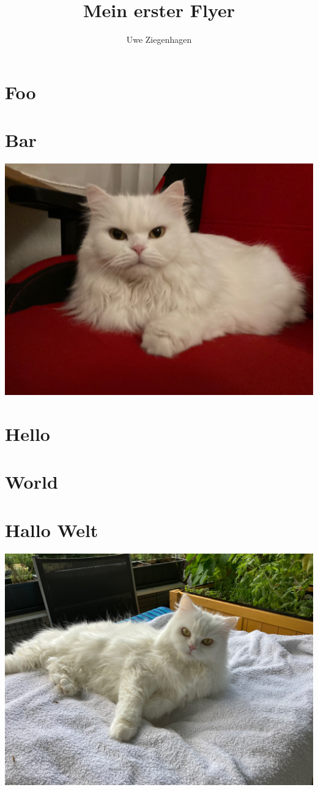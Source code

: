 \documentclass[12pt,ngerman]{leaflet}
\author{Uwe Ziegenhagen}
\title{Mein erster Flyer}
\begin{document}
\maketitle

\section{Foo}

\blindtext[2]

\section{Bar}

\includegraphics[width=\textwidth]{./Bilder/Katze}

\blindtext

\section{Hello}

\blindtext[4]

\section{World}

\blindtext

\section{Hallo Welt}

\blindtext

\includegraphics[width=\textwidth]{./Bilder/Katze1}
\end{document}
